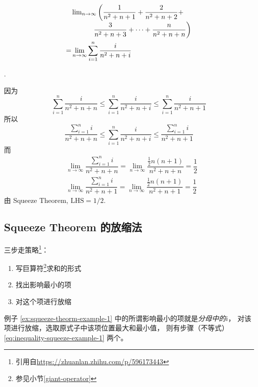\begin{example}
    \label{ex:squeeze-theorm-example-1}
    \begin{align*}
        &\splitfrac{
            \lim_{n \to \infty} \left(
            \dfrac{1}{n^2 + n + 1} + 
            \dfrac{2}{n^2 + n + 2} + 
            \right.
        }{
            \left.
            \dfrac{3}{n^2 + n + 3} + 
            \cdots + 
            \dfrac{n}{n^2 + n + n}
            \right)
        } \\
        = &\lim_{n \to \infty} \sum_{i = 1}^n \dfrac{i}{n^2 + n + i}
    \end{align*}

    \cite[question 137]{w660}.
    
    因为   
    \begin{equation}
        \label{eq:inequality-squeeze-example-1}
        \sum_{i = 1}^{n} \dfrac{i}{n^2 + n + n} \leq 
        \sum_{i = 1}^{n} \dfrac{i}{n^2 + n + i} \leq 
        \sum_{i = 1}^{n} \dfrac{i}{n^2 + n + 1}
    \end{equation}
    所以
    \[
        \dfrac{\sum_{i = 1}^n i}{n^2 + n + n} \leq 
        \sum_{i = 1}^{n} \dfrac{i}{n^2 + n + i} \leq 
        \dfrac{\sum_{i = 1}^n i}{n^2 + n + 1}
    \]
    而
    \begin{align*}
        &\lim_{n \to \infty} \dfrac{\sum_{i = 1}^n i}{n^2 + n + n} 
        =\lim_{n \to \infty} \dfrac{\frac{1}{2} n(n + 1)}{n^2 + n +n} 
        =\dfrac{1}{2}\\
        &\lim_{n \to \infty} \dfrac{\sum_{i = 1}^n i}{n^2 + n + 1} 
        =\lim_{n \to \infty} \dfrac{\frac{1}{2} n(n + 1)}{n^2 + n +1} 
        =\dfrac{1}{2}
    \end{align*}
    由 Squeeze Theorem, $\text{LHS} = 1/2$.
\end{example}

\subsection{Squeeze Theorem 的放缩法}

三步走策略\footnote{引用自\url{https://zhuanlan.zhihu.com/p/596173443}}：
\begin{enumerate}
    \item 写巨算符\footnote{参见小节\ref{giant-operator}}求和的形式
    \item 找出影响最小的项
    \item 对这个项进行放缩
\end{enumerate}

例子 \ref{ex:squeeze-theorm-example-1} 
中的所谓影响最小的项就是\emph{分母中的}$i$，
对该项进行放缩，选取原式子中该项位置最大和最小值，
则有步骤（不等式）\ref{eq:inequality-squeeze-example-1} 两个。

